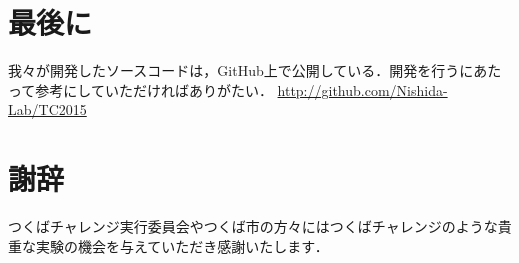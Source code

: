 \documentclass[10pt,a4paper]{jarticle}
\begin{document}
\section{最後に}
我々が開発したソースコードは，GitHub上で公開している．開発を行うにあたって参考にしていただければありがたい．
\url{http://github.com/Nishida-Lab/TC2015}

\section*{謝辞}
つくばチャレンジ実行委員会やつくば市の方々にはつくばチャレンジのような貴重な実験の機会を与えていただき感謝いたします．



 

\end{document}
